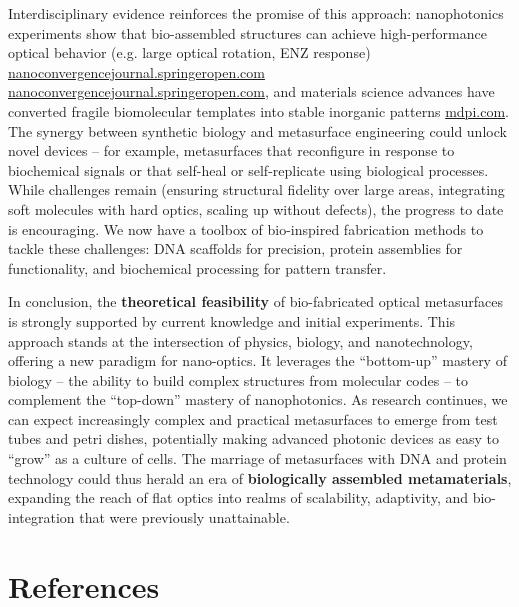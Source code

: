 \documentclass[11pt,a4paper]{article}
\begin{document}
Interdisciplinary evidence reinforces the promise of this approach: nanophotonics experiments show that bio-assembled structures can achieve high-performance optical behavior (e.g. large optical rotation, ENZ response) \href{https://nanoconvergencejournal.springeropen.com/articles/10.1186/s40580-020-00226-7#:~:text=match at L923 DNA,143]. Here%2C DNA is}{nanoconvergencejournal.springeropen.com} \href{https://nanoconvergencejournal.springeropen.com/articles/10.1186/s40580-020-00226-7#:~:text=fabricated by self,DNA sequences for achieving different}{nanoconvergencejournal.springeropen.com}, and materials science advances have converted fragile biomolecular templates into stable inorganic patterns \href{https://www.mdpi.com/2079-6374/12/11/962#:~:text=match at L2031 DNA origami,a hard mask for surface}{mdpi.com}. The synergy between synthetic biology and metasurface engineering could unlock novel devices -- for example, metasurfaces that reconfigure in response to biochemical signals or that self-heal or self-replicate using biological processes. While challenges remain (ensuring structural fidelity over large areas, integrating soft molecules with hard optics, scaling up without defects), the progress to date is encouraging. We now have a toolbox of bio-inspired fabrication methods to tackle these challenges: DNA scaffolds for precision, protein assemblies for functionality, and biochemical processing for pattern transfer.

In conclusion, the \textbf{theoretical feasibility} of bio-fabricated optical metasurfaces is strongly supported by current knowledge and initial experiments. This approach stands at the intersection of physics, biology, and nanotechnology, offering a new paradigm for nano-optics. It leverages the ``bottom-up'' mastery of biology -- the ability to build complex structures from molecular codes -- to complement the ``top-down'' mastery of nanophotonics. As research continues, we can expect increasingly complex and practical metasurfaces to emerge from test tubes and petri dishes, potentially making advanced photonic devices as easy to ``grow'' as a culture of cells. The marriage of metasurfaces with DNA and protein technology could thus herald an era of \textbf{biologically assembled metamaterials}, expanding the reach of flat optics into realms of scalability, adaptivity, and bio-integration that were previously unattainable.

\section*{References}
\end{document}
